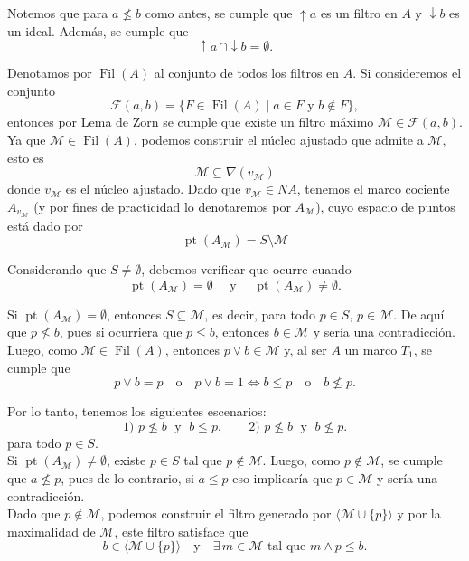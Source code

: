 \documentclass[11pt]{amsart}
\DeclareMathOperator{\pt}{pt}
\DeclareMathOperator{\Fil}{Fil}
\theoremstyle{plain}
\theoremstyle{definition}
\begin{document}
Notemos que para $a\nleq b$ como antes, se cumple que $\uparrow a$ es un filtro en $A$ y $\downarrow b$ es un ideal. Además, se cumple que 
\[
\uparrow a\, \cap \downarrow b = \emptyset.
\]

Denotamos por $\Fil(A)$ al conjunto de todos los filtros en $A$. Si consideremos el conjunto
\[
\mathcal{F}(a,b)=\{F\in \Fil(A)\mid a\in F\text{ y }b\notin F\},
\]
entonces por Lema de Zorn se cumple que existe un filtro máximo $\mathcal{M}\in \mathcal{F}(a,b)$. Ya que $\mathcal{M}\in \Fil(A)$, podemos construir el núcleo ajustado que admite a $\mathcal{M}$, esto es
\[
\mathcal{M}\subseteq \nabla(v_{\mathcal{M}})
\]
donde $v_\mathcal{M}$ es el núcleo ajustado. Dado que $v_\mathcal{M}\in NA$, tenemos el marco cociente $A_{v_{\mathcal{M}}}$ (y por fines de practicidad lo denotaremos por $A_\mathcal{M}$), cuyo espacio de puntos está dado por
\[
\pt(A_\mathcal{M})=S\setminus \mathcal{M}
\]

Considerando que $S\neq \emptyset$, debemos verificar que ocurre cuando 
\[
\pt(A_\mathcal{M})=\emptyset\quad \text{ y }\quad \pt(A_\mathcal{M})\neq \emptyset.
\]

Si $\pt(A_\mathcal{M})=\emptyset$, entonces $S\subseteq \mathcal{M}$, es decir, para todo $p\in S$, $p \in \mathcal{M}$. De aquí que $p\nleq b$, pues si ocurriera que $p\leq b$, entonces $b\in \mathcal{M}$ y sería una contradicción. \\

Luego, como $\mathcal{M}\in \Fil(A)$, entonces $p\vee b\in\mathcal{M}$ y, al ser $A$ un marco $T_1$, se cumple que
\[
p\vee b=p\quad \text{o}\quad p\vee b=1  \iff b\leq p\quad \text{o}\quad b\nleq p.
\]

Por lo tanto, tenemos los siguientes escenarios:
\[
\text{1) } p\nleq b\;\text{ y }\; b\leq p, \qquad \text{2) } p\nleq b\; \text{ y }\;b\nleq p. 
\]
para todo $p\in S$.\\

Si $\pt(A_\mathcal{M})\neq \emptyset$, existe  $p\in S$ tal que $p\notin \mathcal{M}$.
Luego, como $p\notin \mathcal{M}$, se cumple que $a\nleq p$, pues de lo contrario, si $a\leq p$ eso implicaría que $p\in \mathcal{M}$ y sería una contradicción.\\

Dado que $p\notin \mathcal{M}$, podemos construir el filtro generado por $\langle \mathcal{M}\cup \{p\}\rangle$ y por la maximalidad de $\mathcal{M}$, este filtro satisface que 
\[
b\in \langle\mathcal{M}\cup \{p\}\rangle \quad \text{y}\quad \exists\, m\in \mathcal{M} \text{ tal que }m\wedge p\leq b.
\]
\end{document}
